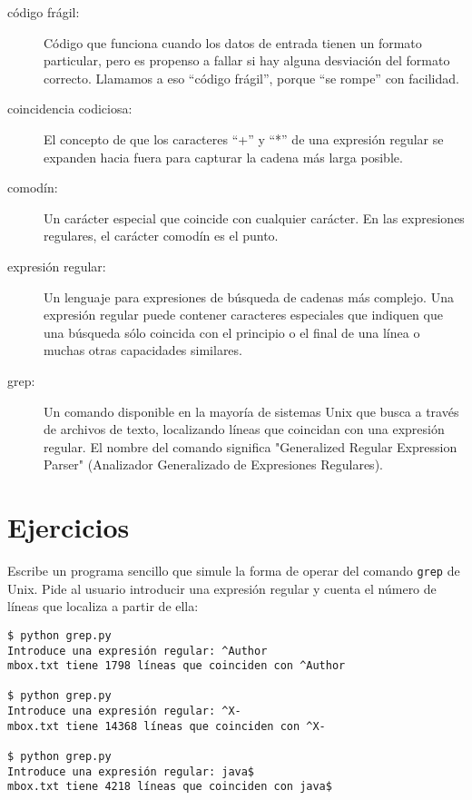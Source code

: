 \begin{description}

\item[código frágil:]
Código que funciona cuando los datos de entrada tienen un formato particular, pero es propenso a fallar
si hay alguna desviación del formato correcto. Llamamos a eso ``código frágil'',
porque ``se rompe'' con facilidad.

\item[coincidencia codiciosa:]
El concepto de que los caracteres ``+'' y ``*'' de una expresión regular se expanden hacia fuera para
capturar la cadena más larga posible.

\item[comodín:]
Un carácter especial que coincide con cualquier carácter. En las expresiones regulares, el carácter
comodín es el punto.

\item[expresión regular:]
Un lenguaje para expresiones de búsqueda de cadenas más complejo. Una expresión regular puede contener
caracteres especiales que indiquen que una búsqueda sólo coincida con el principio o el final de una línea
o muchas otras capacidades similares.

\item[grep:]
Un comando disponible en la mayoría de sistemas Unix que busca a través de archivos de texto, localizando líneas
que coincidan con una expresión regular. El nombre del comando significa "Generalized Regular Expression Parser"
(Analizador Generalizado de Expresiones Regulares).

\end{description}

\section{Ejercicios}

\begin{ex}
Escribe un programa sencillo que simule la forma de operar del comando {\tt grep}
de Unix. Pide al usuario introducir una expresión regular y cuenta el número
de líneas que localiza a partir de ella:

\beforeverb
\begin{verbatim}
$ python grep.py
Introduce una expresión regular: ^Author
mbox.txt tiene 1798 líneas que coinciden con ^Author

$ python grep.py
Introduce una expresión regular: ^X-
mbox.txt tiene 14368 líneas que coinciden con ^X-

$ python grep.py
Introduce una expresión regular: java$
mbox.txt tiene 4218 líneas que coinciden con java$
\end{verbatim}
\afterverb
%
\end{ex}

